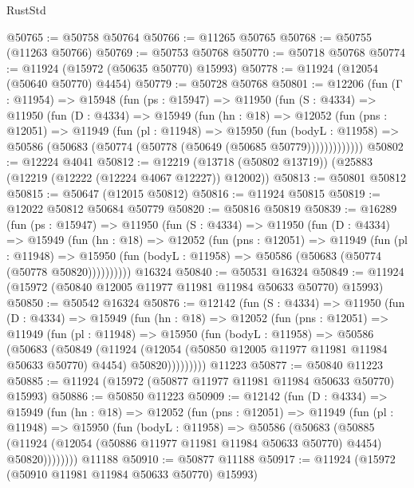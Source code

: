 \begin{lexlean}{RustStd}
\begin{coremodule}
@50765 := @50758 @50764
@50766 := @11265 @50765
@50768 := @50755 (@11263 @50766)
@50769 := @50753 @50768
@50770 := @50718 @50768
@50774 := @11924 (@15972 (@50635 @50770) @15993)
@50778 := @11924 (@12054 (@50640 @50770) @4454)
@50779 := @50728 @50768
@50801 := @12206
    (fun (Γ : @11954) =>
    @15948
      (fun (ps : @15947) =>
      @11950
        (fun (S : @4334) =>
        @11950
          (fun (D : @4334) =>
          @15949
            (fun (hn : @18) =>
            @12052
              (fun (pns : @12051) =>
              @11949
                (fun (pl : @11948) =>
                @15950
                  (fun (bodyL : @11958) =>
                  @50586 (@50683 (@50774 (@50778 (@50649 (@50685 @50779)))))))))))))
@50802 := @12224 @4041
@50812 := @12219 (@13718 (@50802 @13719)) (@25883 (@12219 (@12222 (@12224 @4067 @12227)) @12002))
@50813 := @50801 @50812
@50815 := @50647 (@12015 @50812)
@50816 := @11924 @50815
@50819 := @12022 @50812 @50684 @50779
@50820 := @50816 @50819
@50839 := @16289
    (fun (ps : @15947) =>
    @11950
      (fun (S : @4334) =>
      @11950
        (fun (D : @4334) =>
        @15949
          (fun (hn : @18) =>
          @12052
            (fun (pns : @12051) =>
            @11949
              (fun (pl : @11948) =>
              @15950 (fun (bodyL : @11958) => @50586 (@50683 (@50774 (@50778 @50820))))))))))
    @16324
@50840 := @50531 @16324
@50849 := @11924 (@15972 (@50840 @12005 @11977 @11981 @11984 @50633 @50770) @15993)
@50850 := @50542 @16324
@50876 := @12142
    (fun (S : @4334) =>
    @11950
      (fun (D : @4334) =>
      @15949
        (fun (hn : @18) =>
        @12052
          (fun (pns : @12051) =>
          @11949
            (fun (pl : @11948) =>
            @15950
              (fun (bodyL : @11958) =>
              @50586
                (@50683
                  (@50849
                    (@11924
                      (@12054 (@50850 @12005 @11977 @11981 @11984 @50633 @50770) @4454)
                      @50820)))))))))
    @11223
@50877 := @50840 @11223
@50885 := @11924 (@15972 (@50877 @11977 @11981 @11984 @50633 @50770) @15993)
@50886 := @50850 @11223
@50909 := @12142
    (fun (D : @4334) =>
    @15949
      (fun (hn : @18) =>
      @12052
        (fun (pns : @12051) =>
        @11949
          (fun (pl : @11948) =>
          @15950
            (fun (bodyL : @11958) =>
            @50586
              (@50683
                (@50885
                  (@11924 (@12054 (@50886 @11977 @11981 @11984 @50633 @50770) @4454) @50820))))))))
    @11188
@50910 := @50877 @11188
@50917 := @11924 (@15972 (@50910 @11981 @11984 @50633 @50770) @15993)

\end{coremodule}
\end{lexlean}
